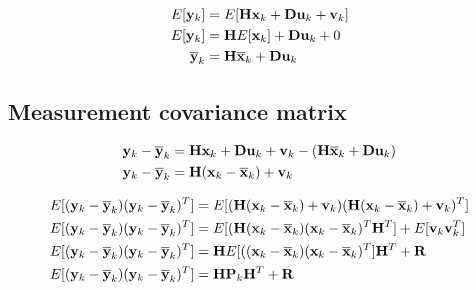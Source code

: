 \begin{align*}
  E[\mathbf{y}_k] &= E[\mathbf{H}\mathbf{x}_k + \mathbf{D}\mathbf{u}_k + \mathbf{v}_k] \\
  E[\mathbf{y}_k] &= \mathbf{H}E[\mathbf{x}_k] + \mathbf{D}\mathbf{u}_k + 0 \\
  \overline{\mathbf{y}}_k &= \mathbf{H}\overline{\mathbf{x}}_k + \mathbf{D}\mathbf{u}_k
\end{align*}

\subsection{Measurement covariance matrix}

\begin{align*}
  \mathbf{y}_k - \overline{\mathbf{y}}_k &= \mathbf{H}\mathbf{x}_k + \mathbf{D}\mathbf{u}_k + \mathbf{v}_k -
    (\mathbf{H}\overline{\mathbf{x}}_k + \mathbf{D}\mathbf{u}_k) \\
  \mathbf{y}_k - \overline{\mathbf{y}}_k &= \mathbf{H}(\mathbf{x}_k - \overline{\mathbf{x}}_k) + \mathbf{v}_k
\end{align*}

\begin{align*}
  E[(\mathbf{y}_k - \overline{\mathbf{y}}_k)(\mathbf{y}_k - \overline{\mathbf{y}}_k)^T] &=
    E[(\mathbf{H}(\mathbf{x}_k - \overline{\mathbf{x}}_k) + \mathbf{v}_k)
      (\mathbf{H}(\mathbf{x}_k - \overline{\mathbf{x}}_k) + \mathbf{v}_k)^T] \\
  E[(\mathbf{y}_k - \overline{\mathbf{y}}_k)(\mathbf{y}_k - \overline{\mathbf{y}}_k)^T] &=
    E[(\mathbf{H}(\mathbf{x}_k - \overline{\mathbf{x}}_k)
      (\mathbf{x}_k - \overline{\mathbf{x}}_k)^T\mathbf{H}^T] +
    E[\mathbf{v}_k\mathbf{v}_k^T] \\
  E[(\mathbf{y}_k - \overline{\mathbf{y}}_k)(\mathbf{y}_k - \overline{\mathbf{y}}_k)^T] &=
    \mathbf{H}E[((\mathbf{x}_k - \overline{\mathbf{x}}_k)(\mathbf{x}_k - \overline{\mathbf{x}}_k)^T]
    \mathbf{H}^T + \mathbf{R} \\
  E[(\mathbf{y}_k - \overline{\mathbf{y}}_k)(\mathbf{y}_k - \overline{\mathbf{y}}_k)^T] &=
    \mathbf{H}\mathbf{P}_k\mathbf{H}^T + \mathbf{R}
\end{align*}
